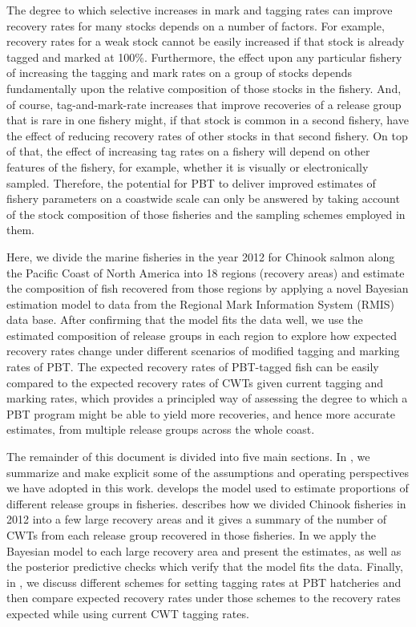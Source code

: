 \documentclass[11pt]{article}
\begin{document}
The degree to which selective increases in mark and tagging rates can improve recovery rates for many 
stocks depends on a number of factors.  For example, recovery rates for a weak stock cannot be 
easily increased if that stock is already tagged and marked at 100\%.  Furthermore,
the effect upon any particular fishery of increasing the tagging and mark rates on a group of stocks depends
fundamentally upon the relative composition of those stocks in the fishery.  And, of course,
tag-and-mark-rate increases that improve recoveries of a release group that is rare in one fishery might,
if that stock is common in a second fishery, have the effect of reducing recovery rates of other
stocks in that second fishery.  On top of that, the effect of increasing tag rates on a fishery will
depend on other features of the fishery, for example, whether it is visually or electronically sampled.
Therefore, the potential for PBT to deliver improved estimates of fishery parameters on a coastwide scale
can only be answered by taking account of the stock composition of those fisheries and the sampling
schemes employed in them.  

Here, we divide the marine fisheries in the year 2012 for Chinook salmon along
the Pacific Coast of North America into
18 regions (recovery areas) and estimate the composition of fish recovered from those regions by applying a novel
Bayesian estimation model to data from the Regional Mark Information System (RMIS) data base.  After
confirming that the model fits the data well, we use the estimated composition of release groups
in each region to explore how expected recovery rates change under different scenarios of modified 
tagging and marking rates of PBT.  The expected recovery rates of PBT-tagged fish can be easily compared
to the expected recovery rates of CWTs given current tagging and marking rates, which provides a principled
way of assessing the degree to which a PBT program might be able to yield more recoveries, 
and hence more accurate estimates, from multiple release groups across the whole coast.   


The remainder of this document is divided into five main sections.  In {\sc {}},
we summarize and make explicit some of the assumptions and operating perspectives we have adopted
in this work.  {\sc {}} develops the  model used to estimate
proportions of different release groups in fisheries.  {\sc {}} describes how we divided
Chinook fisheries in 2012 into a few large recovery areas and it gives a summary of the number of CWTs from
each release group recovered in those fisheries. In {\sc {}} we apply the
Bayesian model to each large recovery area and present the estimates, as well as the posterior
predictive checks which verify that the model fits the data.  Finally, in
{\sc{}}, we discuss different schemes for setting tagging rates at
PBT hatcheries and then compare expected recovery rates under those schemes to the recovery
rates expected while using current CWT tagging rates.  
\end{document}
